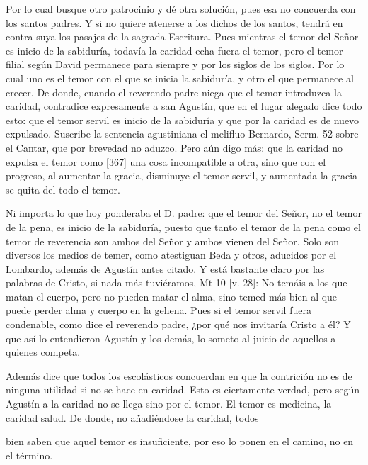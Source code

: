 Por lo cual busque otro patrocinio y dé otra solución, pues esa no concuerda con los santos padres. Y si no quiere atenerse a los dichos de los santos, tendrá en contra suya los pasajes de la sagrada Escritura. Pues mientras el temor del Señor es inicio de la sabiduría, todavía la caridad echa fuera el temor, pero el temor filial según David permanece para siempre y por los siglos de los siglos. Por lo cual uno es el temor con el que se inicia la sabiduría, y otro el que permanece al crecer. De donde, cuando el reverendo padre niega que el temor introduzca la caridad, contradice expresamente a san Agustín, que en el lugar alegado dice todo esto: que el temor servil es inicio de la sabiduría y que por la caridad es de nuevo expulsado. Suscribe la sentencia agustiniana el melifluo Bernardo, Serm. 52 sobre el Cantar, que por brevedad no aduzco. Pero aún digo más: que la caridad no expulsa el temor como [367] una cosa incompatible a otra, sino que con el progreso, al aumentar la gracia, disminuye el temor servil, y aumentada la gracia se quita del todo el temor.

Ni importa lo que hoy ponderaba el D. padre: que el temor del Señor, no el temor de la pena, es inicio de la sabiduría, puesto que tanto el temor de la pena como el temor de reverencia son ambos del Señor y ambos vienen del Señor. Solo son diversos los medios de temer, como atestiguan Beda y otros, aducidos por el Lombardo, además de Agustín antes citado. Y está bastante claro por las palabras de Cristo, si nada más tuviéramos, Mt 10 [v. 28]: No temáis a los que matan el cuerpo, pero no pueden matar el alma, sino temed más bien al que puede perder alma y cuerpo en la gehena. Pues si el temor servil fuera condenable, como dice el reverendo padre, ¿por qué nos invitaría Cristo a él? Y que así lo entendieron Agustín y los demás, lo someto al juicio de aquellos a quienes competa.

Además dice que todos los escolásticos concuerdan en que la contrición no es de ninguna utilidad si no se hace en caridad. Esto es ciertamente verdad, pero según Agustín a la caridad no se llega sino por el temor. El temor es medicina, la caridad salud. De donde, no añadiéndose la caridad, todos

bien saben que aquel temor es insuficiente, por eso lo ponen en el camino, no en el término.


